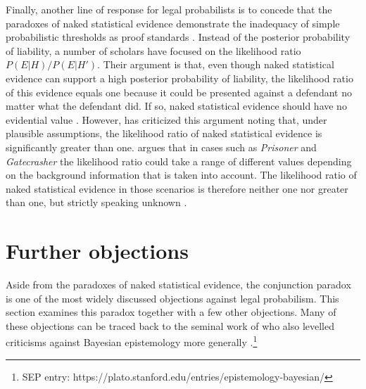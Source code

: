 \documentclass{article}
\begin{document}
Finally, another line of response for legal probabilists is to concede that the paradoxes of naked statistical evidence demonstrate the inadequacy of simple probabilistic thresholds as proof standards  \citep{Urbaniak2019standards2}.
Instead of the posterior probability of liability, a number of scholars have focused on the likelihood ratio $P(E\vert H)/P(E \vert H')$. Their argument is that, even though naked statistical evidence can support a high posterior probability of liability, the likelihood ratio of this evidence equals one because it could be presented against a defendant  no matter what the defendant did. If so, naked statistical evidence should have no evidential value  \citep{cheng2012reconceptualizing,sullivan2016LikelihoodStoryTheory}. 
 However, \cite{dahlmanNakedStat2020} has criticized this argument noting that, under plausible assumptions, the likelihood ratio of naked statistical evidence is significantly greater than one.  %
\cite{dibello2019TrialStatisticsHigh} argues  
that in cases such as \textit{Prisoner} and \textit{Gatecrasher} the likelihood ratio could take a range of different values depending on the background information that is taken into account. The likelihood ratio of naked statistical evidence in those scenarios is therefore neither one nor greater than one, but strictly speaking unknown 
\citep[for a critique of this argument, see][]{Urbaniak2020Decision}.












 









 















 
\section{Further objections}\label{sec:Further}


Aside from the paradoxes of naked statistical evidence, the conjunction paradox is one of the most widely discussed objections against legal probabilism. This section examines this paradox together with a few other objections. Many of these objections can be traced back to the seminal work of \citet{Cohen1977The-probable-an} who also levelled criticisms against Bayesian epistemology more generally \citep[for further discussion, see][]{earman1992bayes,bovens2004bayesian,bradley2015critical}.\footnote{SEP entry: https://plato.stanford.edu/entries/epistemology-bayesian/}
\end{document}
